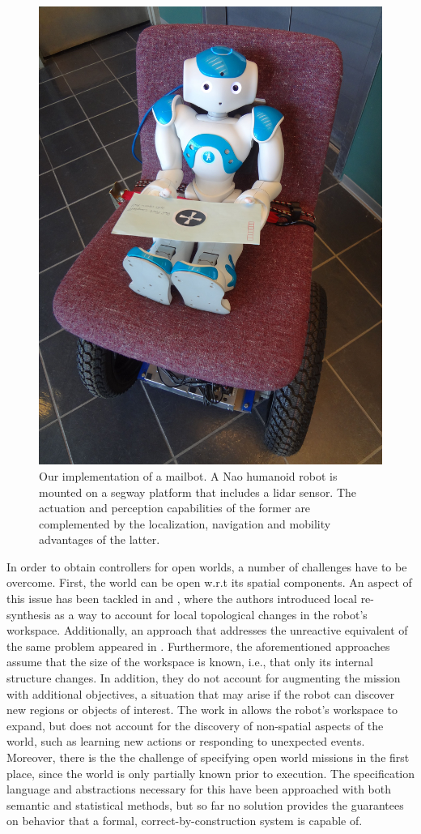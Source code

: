 \begin{figure}[t]
	\centering
	\includegraphics[width=0.7\columnwidth, clip]{./img/mailbot.jpg}
	\caption{Our implementation of a mailbot. A Nao humanoid robot is mounted on a segway platform that includes a lidar sensor. The actuation and perception capabilities of the former are complemented by the localization, navigation and mobility advantages of the latter.}
	\label{Fig:mailbot}
\end{figure}

In order to obtain controllers for open worlds, a number of challenges have to be overcome. 
First, the world can be open w.r.t its spatial components. An aspect of this issue has been tackled in \cite{MurrayICRA2012} and \cite{MurrayICRA2013a}, where the authors introduced local re-synthesis as a way to account for local topological changes in the robot's workspace. 
Additionally, an approach that addresses the unreactive equivalent of the same problem appeared in \cite{Dimos2013ICRA}. 
Furthermore, the aforementioned approaches assume that the size of the workspace is known, i.e., that only its internal structure changes. In addition, they do not account for augmenting the mission with additional objectives, a situation that may arise if the robot can discover new regions or objects of interest. 
The work in \cite{BingxinRSS2012} allows the robot's workspace to expand, but does not account for the discovery of non-spatial aspects of the world, such as learning new actions or responding to unexpected events.
Moreover, there is the the challenge of specifying open world missions in the first place, since the world is only partially known prior to execution. The specification language and abstractions necessary for this have been approached with both semantic \cite{Joshi2012, MatthiasAI2010} and statistical \cite{Tellex2011} methods, but so far no solution provides the guarantees on behavior that a formal, correct-by-construction system is capable of. %

